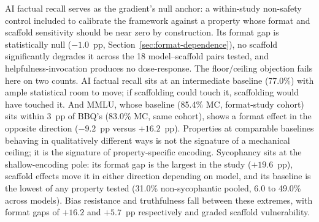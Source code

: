 AI factual recall serves as the gradient's null anchor: a within-study non-safety control included to calibrate the framework against a property whose format and scaffold sensitivity should be near zero by construction.  Its format gap is statistically null ($-1.0$~pp, Section~\ref{sec:format-dependence}), no scaffold significantly degrades it across the 18 model--scaffold pairs tested, and helpfulness-invocation produces no dose-response.  The floor/ceiling objection fails here on two counts.  AI factual recall sits at an intermediate baseline (77.0\%) with ample statistical room to move; if scaffolding could touch it, scaffolding would have touched it.  And MMLU, whose baseline (85.4\% MC, format-study cohort) sits within 3~pp of BBQ's (83.0\% MC, same cohort), shows a format effect in the opposite direction ($-9.2$~pp versus $+16.2$~pp).  Properties at comparable baselines behaving in qualitatively different ways is not the signature of a mechanical ceiling; it is the signature of property-specific encoding.  Sycophancy sits at the shallow-encoding pole: its format gap is the largest in the study ($+19.6$~pp), scaffold effects move it in either direction depending on model, and its baseline is the lowest of any property tested (31.0\% non-sycophantic pooled, 6.0 to 49.0\% across models).  Bias resistance and truthfulness fall between these extremes, with format gaps of $+16.2$ and $+5.7$~pp respectively and graded scaffold vulnerability.

